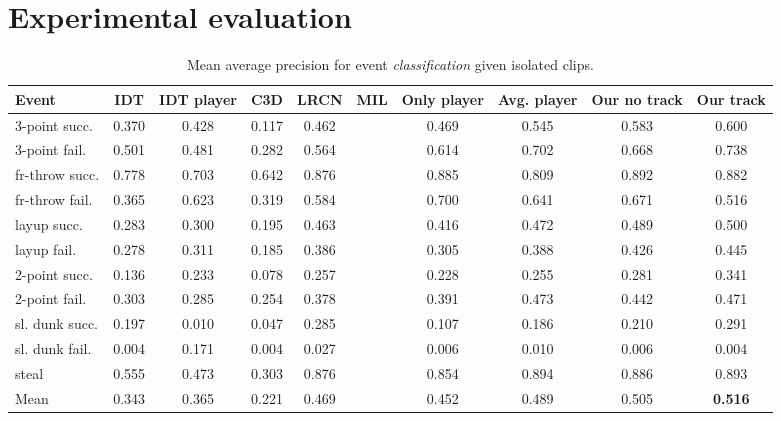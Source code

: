 \section{Experimental evaluation}
\label{sec:experiments}

\begin{table}[ht!]
\begin{center}
\small
 \begin{tabular}{|l|c|c|c|c|c|c|c|c|c|}
  \hline
Event & IDT\cite{Wang_CVPR11} & IDT\cite{Wang_CVPR11} player & C3D \cite{Tran_arxiv14} & LRCN \cite{Donahue_arxiv14} & MIL\cite{} & Only player & Avg. player & Our no track & Our track \\ \hline \hline

3-point succ.    & 0.370 & 0.428 & 0.117 & 0.462 &  & 0.469 & 0.545 & 0.583 & 0.600 \\
3-point fail.    & 0.501 &  0.481& 0.282 & 0.564 &  & 0.614 & 0.702 & 0.668 & 0.738 \\
fr-throw succ. & 0.778 &  0.703& 0.642 & 0.876 &  & 0.885 & 0.809 & 0.892 & 0.882 \\
fr-throw fail. & 0.365 &  0.623& 0.319 & 0.584 &  & 0.700 & 0.641 & 0.671 & 0.516 \\
layup succ.      & 0.283 & 0.300 & 0.195 & 0.463 &  & 0.416 & 0.472 & 0.489 & 0.500 \\
layup fail.      & 0.278 &0.311  & 0.185 & 0.386 &  & 0.305 & 0.388 & 0.426 & 0.445 \\
2-point succ.    & 0.136 &  0.233 & 0.078 & 0.257 &  & 0.228 & 0.255 & 0.281 & 0.341 \\
2-point fail.    & 0.303 &  0.285 & 0.254 & 0.378 &  & 0.391 & 0.473 & 0.442 & 0.471 \\
sl. dunk succ.  & 0.197 &  0.010 & 0.047 & 0.285 &  & 0.107 & 0.186 & 0.210 & 0.291 \\
sl. dunk fail.  & 0.004 &  0.171& 0.004 & 0.027 &  & 0.006 & 0.010 & 0.006 & 0.004 \\
steal            & 0.555 &  0.473& 0.303 & 0.876 &  & 0.854 & 0.894 & 0.886 & 0.893 \\ \hline \hline
Mean             & 0.343 &  0.365 & 0.221 & 0.469 &  & 0.452 & 0.489 & 0.505 & \textbf{0.516} \\ \hline
  \end{tabular}
\end{center}
  \caption{Mean average precision for event {\em classification} given
    isolated clips.}
  \label{tab:event_class}
  \label{tab:class_res}
\end{table}


